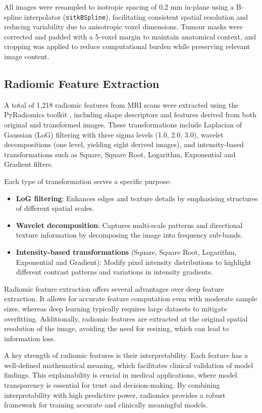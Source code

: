 \documentclass[12pt, a4paper]{report}
\begin{document}
All images were resampled to isotropic spacing of 0.2 mm in-plane using a B-spline interpolator (\texttt{sitkBSpline}), facilitating consistent spatial resolution and reducing variability due to anisotropic voxel dimensions. Tumour masks were corrected and padded with a 5-voxel margin to maintain anatomical context, and cropping was applied to reduce computational burden while preserving relevant image content.

\subsection{Radiomic Feature Extraction}

A total of 1,218 radiomic features from MRI scans were extracted using the PyRadiomics toolkit \cite{pyradiomics}, including shape descriptors and features derived from both original and transformed images. These transformations include Laplacian of Gaussian (LoG) filtering with three sigma levels (1.0, 2.0, 3.0), wavelet decompositions (one level, yielding eight derived images), and intensity-based transformations such as Square, Square Root, Logarithm, Exponential and Gradient filters.

Each type of transformation serves a specific purpose:

\begin{itemize}
    \item \textbf{LoG filtering}: Enhances edges and texture details by emphasising structures of different spatial scales.
    \item \textbf{Wavelet decomposition}: Captures multi-scale patterns and directional texture information by decomposing the image into frequency sub-bands.
    \item \textbf{Intensity-based transformations} (Square, Square Root, Logarithm, Exponential and Gradient): Modify pixel intensity distributions to highlight different contrast patterns and variations in intensity gradients.
\end{itemize}

Radiomic feature extraction offers several advantages over deep feature extraction. It allows for accurate feature computation even with moderate sample sizes, whereas deep learning typically requires large datasets to mitigate overfitting. Additionally, radiomic features are extracted at the original spatial resolution of the image, avoiding the need for resizing, which can lead to information loss.

A key strength of radiomic features is their interpretability. Each feature has a well-defined mathematical meaning, which facilitates clinical validation of model findings. This explainability is crucial in medical applications, where model transparency is essential for trust and decision-making. By combining interpretability with high predictive power, radiomics provides a robust framework for training accurate and clinically meaningful models.
\end{document}
